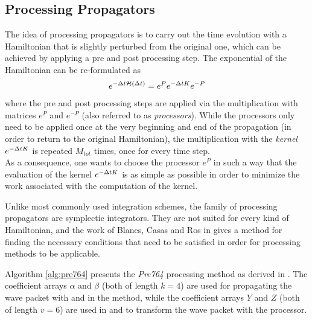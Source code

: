 \subsection{Processing Propagators}
\label{sub:pre764_propagator}
%
The idea of processing propagators is to carry out the time evolution with a Hamiltonian that is slightly perturbed from the original one, which can be achieved by applying a pre and post processing step.
The exponential of the Hamiltonian can be re-formulated as
%
\begin{align}
	e^{- \Delta t \mathcal{H} (\Delta t)} = e^P e^{- \Delta t K} e^{-P}
\end{align}
%
where the pre and post processing steps are applied via the multiplication with matrices $e^P$ and $e^{-P}$ (also referred to as \emph{processors}).
While the processors only need to be applied once at the very beginning and end of the propagation (in order to return to the original Hamiltonian), the multiplication with the \emph{kernel} $e^{-\Delta t K}$ is repeated $M_{tot}$ times, once for every time step. \\
As a consequence, one wants to choose the processor $e^P$ in such a way that the evaluation of the kernel $e^{-\Delta t K}$ is as simple as possible in order to minimize the work associated with the computation of the kernel.
\par\medskip
%
Unlike most commonly used integration schemes, the family of processing propagators are symplectic integrators.
They are not suited for every kind of Hamiltonian, and the work of Blanes, Casas and Ros in \cite{Blanes1999} gives a method for finding the  necessary conditions that need to be satisfied in order for processing methods to be applicable.
\par\medskip
%
Algorithm \ref{alg:pre764} presents the \emph{Pre764} processing method as derived in \cite{Blanes1999}.
The coefficient arrays $\alpha$ and $\beta$ (both of length $k=4$) are used for propagating the wave packet with  and  in the  method, while the coefficient arrays $Y$ and $Z$ (both of length $v=6$) are used in  and  to transform the wave packet with the processor.
%
